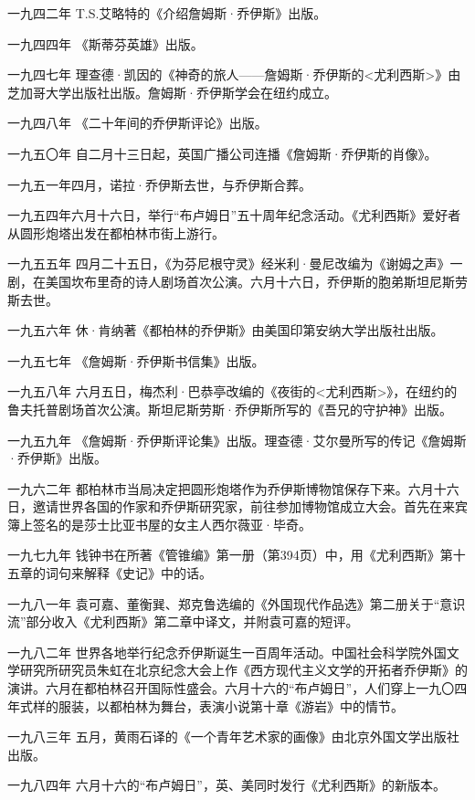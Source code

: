 \par 一九四二年 T.S.艾略特的《介绍詹姆斯·乔伊斯》出版。
\par 一九四四年 《斯蒂芬英雄》出版。
\par 一九四七年 理查德·凯因的《神奇的旅人——詹姆斯·乔伊斯的<尤利西斯>》由芝加哥大学出版社出版。詹姆斯·乔伊斯学会在纽约成立。
\par 一九四八年 《二十年间的乔伊斯评论》出版。
\par 一九五〇年 自二月十三日起，英国广播公司连播《詹姆斯·乔伊斯的肖像》。
\par 一九五一年四月，诺拉·乔伊斯去世，与乔伊斯合葬。
\par 一九五四年六月十六日，举行“布卢姆日”五十周年纪念活动。《尤利西斯》爱好者从圆形炮塔出发在都柏林市街上游行。
\par 一九五五年 四月二十五日，《为芬尼根守灵》经米利·曼尼改编为《谢姆之声》一剧，在美国坎布里奇的诗人剧场首次公演。六月十六日，乔伊斯的胞弟斯坦尼斯劳斯去世。
\par 一九五六年 休·肯纳著《都柏林的乔伊斯》由美国印第安纳大学出版社出版。
\par 一九五七年 《詹姆斯·乔伊斯书信集》出版。
\par 一九五八年 六月五日，梅杰利·巴恭亭改编的《夜街的<尤利西斯>》，在纽约的鲁夫托普剧场首次公演。斯坦尼斯劳斯·乔伊斯所写的《吾兄的守护神》出版。
\par 一九五九年 《詹姆斯·乔伊斯评论集》出版。理查德·艾尔曼所写的传记《詹姆斯·乔伊斯》出版。
\par 一九六二年 都柏林市当局决定把圆形炮塔作为乔伊斯博物馆保存下来。六月十六日，邀请世界各国的作家和乔伊斯研究家，前往参加博物馆成立大会。首先在来宾簿上签名的是莎士比亚书屋的女主人西尔薇亚·毕奇。
\par 一九七九年 钱钟书在所著《管锥编》第一册（第394页）中，用《尤利西斯》第十五章的词句来解释《史记》中的话。
\par 一九八一年 袁可嘉、董衡巽、郑克鲁选编的《外国现代作品选》第二册关于“意识流”部分收入《尤利西斯》第二章中译文，并附袁可嘉的短评。
\par 一九八二年 世界各地举行纪念乔伊斯诞生一百周年活动。中国社会科学院外国文学研究所研究员朱虹在北京纪念大会上作《西方现代主义文学的开拓者乔伊斯》的演讲。六月在都柏林召开国际性盛会。六月十六的“布卢姆日”，人们穿上一九〇四年式样的服装，以都柏林为舞台，表演小说第十章《游岩》中的情节。
\par 一九八三年 五月，黄雨石译的《一个青年艺术家的画像》由北京外国文学出版社出版。
\par 一九八四年 六月十六的“布卢姆日”，英、美同时发行《尤利西斯》的新版本。
